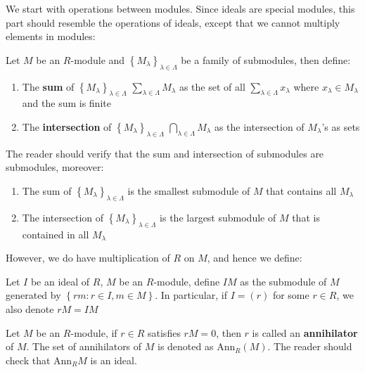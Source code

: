 \documentclass{note-eng}
\begin{document}
We start with operations between modules. Since ideals are special modules, this part should resemble the operations of ideals, except that we cannot multiply elements in modules:

\begin{definition}
    Let $M$ be an $R$-module and $\left\lbrace M_\lambda \right\rbrace_{\lambda \in \Lambda}$ be a family of submodules, then define:
    \begin{enumerate}
        \item The \textbf{sum} of $\left\lbrace M_\lambda \right\rbrace_{\lambda \in \Lambda}$ $\sum\limits_{\lambda \in \Lambda} M_\lambda$ as the set of all $\sum\limits_{\lambda \in \Lambda} x_\lambda$ where $x_\lambda \in M_\lambda$ and the sum is finite
        \item The \textbf{intersection} of $\left\lbrace M_{\lambda} \right\rbrace_{\lambda \in \Lambda}$ $\bigcap\limits_{\lambda \in \Lambda}M_{\lambda}$ as the intersection of $M_\lambda$'s as sets
    \end{enumerate}
    The reader should verify that the sum and intersection of submodules are submodules, moreover:
    \begin{enumerate}
        \item The sum of $\left\lbrace M_\lambda \right\rbrace_{\lambda \in \Lambda}$ is the smallest submodule of $M$ that contains all $M_\lambda$
        \item The intersection of $\left\lbrace M_\lambda \right\rbrace_{\lambda \in \Lambda}$ is the largest submodule of $M$ that is contained in all $M_\lambda$
    \end{enumerate}
\end{definition}

However, we do have multiplication of $R$ on $M$, and hence we define:

\begin{definition}
    Let $I$ be an ideal of $R$, $M$ be an $R$-module, define $IM$ as the submodule of $M$ generated by $\left\lbrace rm: r \in I, m \in M \right\rbrace$. In particular, if $I = (r)$ for some $r \in R$, we also denote $rM = IM$
\end{definition}

\begin{definition}[Annihilator]
    Let $M$ be an $R$-module, if $r \in R$ satisfies $rM = 0$, then $r$ is called an \textbf{annihilator} of $M$. The set of annihilators of $M$ is denoted as $\mathrm{Ann}_R(M)$. The reader should check that $\mathrm{Ann}_R{M}$ is an ideal.
\end{definition}
\end{document}
